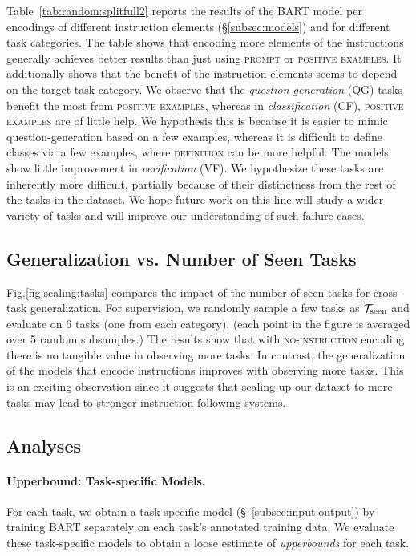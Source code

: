 Table~\ref{tab:random:splitfull2} reports the results of the BART model per encodings of different instruction elements (\S\ref{subsec:models}) and for different task categories. The table shows that encoding more elements of the instructions generally achieves better results than just using  \textsc{prompt} or \textsc{positive examples}. It additionally shows that the benefit of the instruction elements seems to depend on the target task category. We observe that the \emph{question-generation} (QG) tasks benefit the most from \textsc{positive examples}, whereas  in \emph{classification} (CF),
\textsc{positive examples} are of little help. We hypothesis this is because it is easier to mimic question-generation based on a few examples, whereas it is difficult to define classes via a few examples, where \textsc{definition} can be more helpful. The models show little improvement in \emph{verification} (VF). We hypothesize these tasks are inherently more difficult,  partially because of  their distinctness from the rest of the tasks in the dataset. We hope future work on this line will study a wider variety of tasks and will improve our understanding of such failure cases. 

\subsection{Generalization vs. Number of Seen Tasks}
\label{subsec:supervision:size:experiment}
Fig.\ref{fig:scaling:tasks} compares the impact of the number of seen tasks for cross-task generalization. For supervision, we randomly sample a few tasks as $\mathcal{T}_{\textnormal{seen}}$ and evaluate on 6 tasks (one from each category). (each point in the figure is averaged over 5 random subsamples.) The results show that with \textsc{no-instruction} encoding there is no tangible value in observing more tasks. In contrast, the generalization of the models that encode instructions improves with observing more tasks. This is an exciting observation since it suggests that scaling up our dataset to more tasks may lead to stronger instruction-following systems. 

\subsection{Analyses} \label{subsec:task-specific}

\paragraph{Upperbound: Task-specific Models.} For each task, we obtain a task-specific model (\S~\ref{subsec:input:output}) by training BART separately on each task's annotated training data. We evaluate these task-specific models to obtain a loose estimate of \emph{upperbounds} for each task. 

